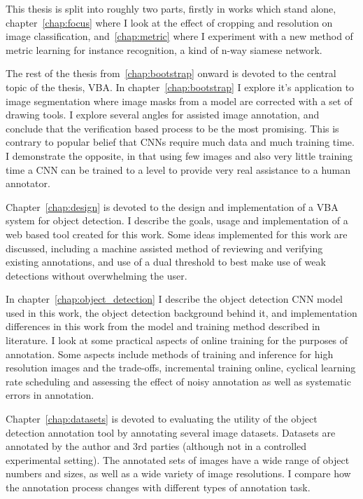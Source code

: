 This thesis is split into roughly two parts, firstly in works which stand alone, chapter~\ref{chap:focus} where I look at the effect of cropping and resolution on image classification, and~\ref{chap:metric} where I experiment with a new method of metric learning for instance recognition, a kind of n-way siamese network. 

The rest of the thesis from~\ref{chap:bootstrap} onward is devoted to the central topic of the thesis, \gls{VBA}. In chapter~\ref{chap:bootstrap} I explore it's application to image segmentation where image masks from a model are corrected with a set of drawing tools. I explore several angles for assisted image annotation, and conclude that the verification based process to be the most promising. This is contrary to popular belief that \gls{CNN}s require much data and much training time. I demonstrate the opposite, in that using few images and also very little training time a \gls{CNN} can be trained to a level to provide very real assistance to a human annotator. 

Chapter~\ref{chap:design} is devoted to the design and implementation of a \gls{VBA} system for object detection. I describe the goals, usage and implementation of a web based tool created for this work. Some ideas implemented for this work are discussed, including a machine assisted method of reviewing and verifying existing annotations, and use of a dual threshold to best make use of weak detections without overwhelming the user.

In chapter~\ref{chap:object_detection} I describe the object detection \gls{CNN} model used in this work, the object detection background behind it, and implementation differences in this work from the model and training method described in literature. I look at some practical aspects of online training for the purposes of annotation. Some aspects include methods of training and inference for high resolution images and the trade-offs, incremental training online, cyclical learning rate scheduling and assessing the effect of noisy annotation as well as systematic errors in annotation. 

Chapter~\ref{chap:datasets} is devoted to evaluating the utility of the object detection annotation tool by annotating several image datasets. Datasets are annotated by the author and 3rd parties (although not in a controlled experimental setting). The annotated sets of images have a wide range of object numbers and sizes, as well as a wide variety of image resolutions. I compare how the annotation process changes with different types of annotation task. 

